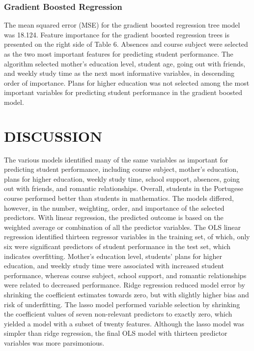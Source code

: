 \documentclass[sigconf]{acmart}
\begin{document}

\subsubsection{Gradient Boosted Regression}

The mean squared error (MSE) for the gradient boosted regression tree model  
was 18.124. Feature importance for the gradient boosted regression trees is 
presented on the right side of Table 6. Absences and course subject were 
selected as the two most important features for predicting student performance. 
The algorithm selected mother's education level, student age, going out with 
friends, and weekly study time as the next most informative variables, in 
descending order of importance. Plans for higher education was not selected 
among the most important variables for predicting student performance in 
the gradient boosted model.   


\section{DISCUSSION}

The various models identified many of the same variables as important for 
predicting student performance, including course subject, mother's education, 
plans for higher education, weekly study time, school support, absences, 
going out with friends, and romantic relationships. Overall, students in the 
Portugese course performed better than students in mathematics. The models 
differed, however, in the number, weighting, order, and importance of the 
selected predictors. With linear regression, the predicted outcome is based
on the weighted average or combination of all the predictor variables. The 
OLS linear regression identified thirteen regressor variables in the training 
set, of which, only six were significant predictors of student performance in 
the test set, which indicates overfitting. Mother's education level, students' 
plans for higher education, and weekly study time were associated with increased 
student performance, whereas course subject, school support, and romantic 
relationships were related to decreased performance. Ridge regression reduced 
model error by shrinking the coefficient estimates towards zero, but with 
slightly higher bias and risk of underfitting. The lasso model performed variable 
selection by shrinking the coefficient values of seven non-relevant predictors 
to exactly zero, which yielded a model with a subset of twenty features. 
Although the lasso model was simpler than ridge regression, the final OLS model 
with thirteen predictor variables was more parsimonious. 
\end{document}
